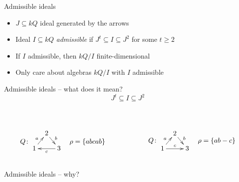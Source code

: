 \documentclass[usenames,dvipsnames]{beamer}
\newcommand{\defn}[1]{\textit{#1}}
\begin{document}
\begin{frame}{Admissible ideals}
\begin{itemize}
\item $J \subseteq kQ$ ideal generated by the arrows
\item Ideal $I \subseteq kQ$ \defn{admissible} if $J^t \subseteq I
\subseteq J^2$ for some $t \ge 2$
\item If $I$ admissible, then $kQ/I$ finite-dimensional
\item Only care about algebras $kQ/I$ with $I$ admissible
\end{itemize}
\end{frame}


\begin{frame}{Admissible ideals -- what does it mean?}{}
{\huge
\[
J^t \subseteq I \subseteq J^2
\]
}
\pause
\vspace{-1em}
\begin{columns}
\begin{column}{.5\textwidth}
\\
\color{OliveGreen}
\[
Q\colon
\vcenter{\xymatrix@R=1em@C=.7em{
& 2 \ar[dr]^b \\
1 \ar[ur]^a &&
3 \ar[ll]^c
}}
\quad
\rho = \{ abcab \}
\]
\end{column}
\begin{column}{.5\textwidth}
\pause
\\
\color{red}
\[
Q\colon
\vcenter{\xymatrix@R=1em@C=.7em{
& 2 \ar[dr]^b \\
1 \ar[ur]^a \ar[rr]^c &&
3
}}
\quad
\rho = \{ ab - c \}
\]
\end{column}
\end{columns}
\end{frame}


\begin{frame}{Admissible ideals -- why?}

\end{frame}
\end{document}
